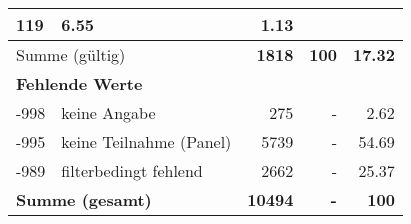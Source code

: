 \begin{longtable}{lXrrr}
       \num{119} &
       \num[round-mode=places,round-precision=2]{6,55} &
         \num[round-mode=places,round-precision=2]{1,13} \\
     \midrule
     \multicolumn{2}{l}{Summe (gültig)} &
       \textbf{\num{1818}} &
     \textbf{100} &
       \textbf{\num[round-mode=places,round-precision=2]{17,32}} \\
     \multicolumn{5}{l}{\textbf{Fehlende Werte}}\\
       -998 &
       keine Angabe &
         \num{275} &
        - &
         \num[round-mode=places,round-precision=2]{2,62} \\
       -995 &
       keine Teilnahme (Panel) &
         \num{5739} &
        - &
         \num[round-mode=places,round-precision=2]{54,69} \\
       -989 &
       filterbedingt fehlend &
         \num{2662} &
        - &
         \num[round-mode=places,round-precision=2]{25,37} \\
     \midrule
     \multicolumn{2}{l}{\textbf{Summe (gesamt)}} &
          \textbf{\num{10494}} &
        \textbf{-} &
        \textbf{100} \\
     \bottomrule
     \end{longtable}
     

